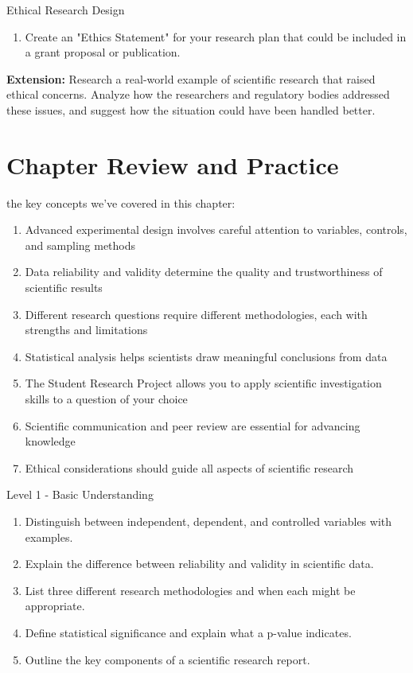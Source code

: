 \begin{investigation}{Ethical Research Design}
\begin{enumerate}
    \item Create an "Ethics Statement" for your research plan that could be included in a grant proposal or publication.
\end{enumerate}

\textbf{Extension:} Research a real-world example of scientific research that raised ethical concerns. Analyze how the researchers and regulatory bodies addressed these issues, and suggest how the situation could have been handled better.
\end{investigation}

\section{Chapter Review and Practice}

 the key concepts we've covered in this chapter:

\begin{enumerate}
    \item Advanced experimental design involves careful attention to variables, controls, and sampling methods
    \item Data reliability and validity determine the quality and trustworthiness of scientific results
    \item Different research questions require different methodologies, each with strengths and limitations
    \item Statistical analysis helps scientists draw meaningful conclusions from data
    \item The Student Research Project allows you to apply scientific investigation skills to a question of your choice
    \item Scientific communication and peer review are essential for advancing knowledge
    \item Ethical considerations should guide all aspects of scientific research
\end{enumerate}

\begin{tieredquestions}{Level 1 - Basic Understanding}
\begin{enumerate}
    \item Distinguish between independent, dependent, and controlled variables with examples.
    \item Explain the difference between reliability and validity in scientific data.
    \item List three different research methodologies and when each might be appropriate.
    \item Define statistical significance and explain what a p-value indicates.
    \item Outline the key components of a scientific research report.
\end{enumerate}
\end{tieredquestions}

